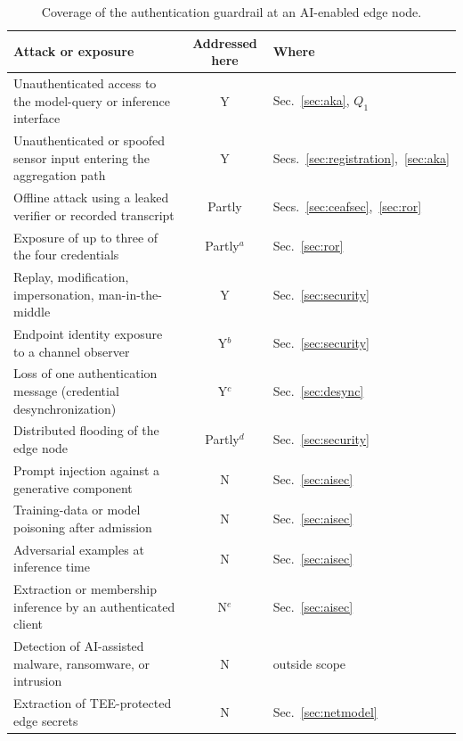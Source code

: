 \documentclass[cmc,article,submit,moreauthors,pdftex]{Definitions/tsp}
\begin{document}
\begin{table}[t]
\caption{Coverage of the authentication guardrail at an AI-enabled edge node.}
\label{tab:coverage}
\begin{tabularx}{\textwidth}{Xcl}
\toprule
\textbf{Attack or exposure} & \textbf{Addressed here} & \textbf{Where}\\
\midrule
Unauthenticated access to the model-query or inference interface & Y & Sec.~\ref{sec:aka}, $Q_1$\\
Unauthenticated or spoofed sensor input entering the aggregation path & Y & Secs.~\ref{sec:registration},~\ref{sec:aka}\\
Offline attack using a leaked verifier or recorded transcript & Partly & Secs.~\ref{sec:ceafsec},~\ref{sec:ror}\\
Exposure of up to three of the four credentials & Partly$^{a}$ & Sec.~\ref{sec:ror}\\
Replay, modification, impersonation, man-in-the-middle & Y & Sec.~\ref{sec:security}\\
Endpoint identity exposure to a channel observer & Y$^{b}$ & Sec.~\ref{sec:security}\\
Loss of one authentication message (credential desynchronization) & Y$^{c}$ & Sec.~\ref{sec:desync}\\
Distributed flooding of the edge node & Partly$^{d}$ & Sec.~\ref{sec:security}\\
\midrule
Prompt injection against a generative component & N & Sec.~\ref{sec:aisec}\\
Training-data or model poisoning after admission & N & Sec.~\ref{sec:aisec}\\
Adversarial examples at inference time & N & Sec.~\ref{sec:aisec}\\
Extraction or membership inference by an authenticated client & N$^{e}$ & Sec.~\ref{sec:aisec}\\
Detection of AI-assisted malware, ransomware, or intrusion & N & outside scope\\
Extraction of TEE-protected edge secrets & N & Sec.~\ref{sec:netmodel}\\
\bottomrule
\end{tabularx}
\end{table}
\end{document}
